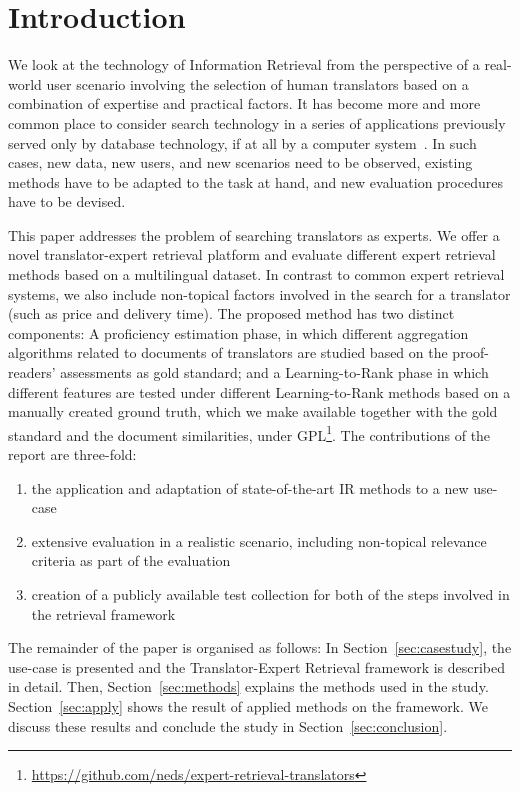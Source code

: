 \section{Introduction}
\label{sec:introduction}
We look at the technology of Information Retrieval from the perspective of a real-world user scenario involving the selection of human translators based on a combination of expertise and practical factors. 
It has become more and more common place to consider search technology in a series of applications previously served only by database technology, if at all by a computer system~\cite{Grefenstette:2011}. In such cases, new data, new users, and new scenarios need to be observed, existing methods have to be adapted to the task at hand, and new evaluation procedures have to be devised. 

This paper addresses the problem of searching translators as experts. We offer a novel translator-expert retrieval platform and evaluate different expert retrieval methods based on a multilingual dataset. In contrast to common expert retrieval systems, we also include non-topical factors involved in the search for a translator (such as price and delivery time). %
The proposed method has two distinct components: A proficiency estimation phase, in which different aggregation algorithms related to documents of translators are studied based on the proof-readers' assessments as gold standard; and a Learning-to-Rank phase in which different features are tested under different Learning-to-Rank methods based on a manually created ground truth, which we make available together with the gold standard and the document similarities, under GPL\footnote{\url{https://github.com/neds/expert-retrieval-translators}}. The contributions of the report are three-fold:
\begin{enumerate}
\vspace{-0.3cm}
\item the application and adaptation of state-of-the-art IR methods to a new use-case
\item extensive evaluation in a realistic scenario, including non-topical relevance criteria as part of the evaluation
\item creation of a publicly available test collection for both of the steps involved in the retrieval framework
\vspace{-0.3cm}
\end{enumerate}

The remainder of the paper is organised as follows: In Section~\ref{sec:casestudy}, the use-case is presented and the Translator-Expert Retrieval framework is described in detail. Then, Section~\ref{sec:methods} explains the methods used in the study. Section~\ref{sec:apply} shows the result of applied methods on the framework. We discuss these results and conclude the study in Section~\ref{sec:conclusion}.
